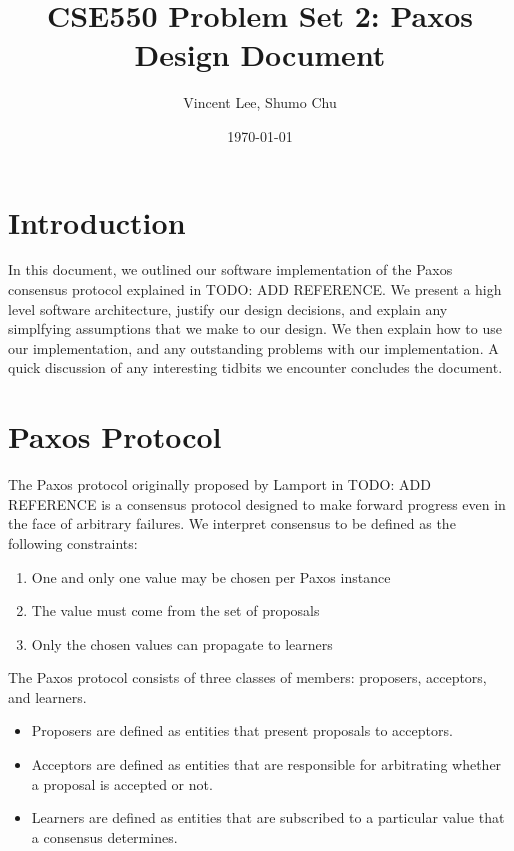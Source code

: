\documentclass{article}
\begin{document}
\title{CSE550 Problem Set 2: Paxos Design Document}
\author{Vincent Lee, Shumo Chu}
\date{\today}

\maketitle

\tableofcontents


\section{Introduction}

In this document, we outlined our software implementation of the Paxos consensus protocol explained in TODO: ADD REFERENCE.
We present a high level software architecture, justify our design decisions, and explain any simplfying assumptions that we make to our design.
We then explain how to use our implementation, and any outstanding problems with our implementation.
A quick discussion of any interesting tidbits we encounter concludes the document.


\section{Paxos Protocol}

The Paxos protocol originally proposed by Lamport in TODO: ADD REFERENCE is a consensus protocol designed to make forward progress even in the face of arbitrary failures.
We interpret consensus to be defined as the following constraints:

\begin{enumerate}
\item One and only one value may be chosen per Paxos instance
\item The value must come from the set of proposals
\item Only the chosen values can propagate to learners
\end{enumerate}

The Paxos protocol consists of three classes of members: proposers, acceptors, and learners.
\begin{itemize}
\item Proposers are defined as entities that present proposals to acceptors.
\item Acceptors are defined as entities that are responsible for arbitrating whether a proposal is accepted or not.
\item Learners are defined as entities that are subscribed to a particular value that a consensus determines.
\end{itemize}
\end{document}
